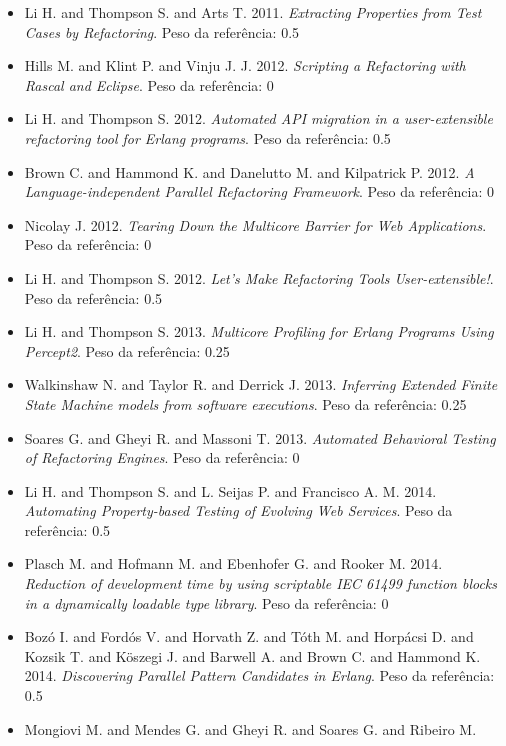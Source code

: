 \begin{itemize}
\item Li H. and Thompson S. and Arts T.
      2011.
      {\it Extracting Properties from Test Cases by Refactoring}.
      Peso da referência: 0.5
\item Hills M. and Klint P. and Vinju J. J.
      2012.
      {\it Scripting a Refactoring with Rascal and Eclipse}.
      Peso da referência: 0
\item Li H. and Thompson S.
      2012.
      {\it Automated API migration in a user-extensible refactoring tool for Erlang programs}.
      Peso da referência: 0.5
\item Brown C. and Hammond K. and Danelutto M. and Kilpatrick P.
      2012.
      {\it A Language-independent Parallel Refactoring Framework}.
      Peso da referência: 0
\item Nicolay J.
      2012.
      {\it Tearing Down the Multicore Barrier for Web Applications}.
      Peso da referência: 0
\item Li H. and Thompson S.
      2012.
      {\it Let's Make Refactoring Tools User-extensible!}.
      Peso da referência: 0.5
\item Li H. and Thompson S.
      2013.
      {\it Multicore Profiling for Erlang Programs Using Percept2}.
      Peso da referência: 0.25
\item Walkinshaw N. and Taylor R. and Derrick J.
      2013.
      {\it Inferring Extended Finite State Machine models from software executions}.
      Peso da referência: 0.25
\item Soares G. and Gheyi R. and Massoni T.
      2013.
      {\it Automated Behavioral Testing of Refactoring Engines}.
      Peso da referência: 0
\item Li H. and Thompson S. and L. Seijas P. and Francisco A. M.
      2014.
      {\it Automating Property-based Testing of Evolving Web Services}.
      Peso da referência: 0.5
\item Plasch M. and Hofmann M. and Ebenhofer G. and Rooker M.
      2014.
      {\it Reduction of development time by using scriptable IEC 61499 function blocks in a dynamically loadable type library}.
      Peso da referência: 0
\item Boz\'{o} I. and Ford\'{o}s V. and Horvath Z. and T\'{o}th M. and Horp\'{a}csi D. and Kozsik T. and K\"{o}szegi J. and Barwell A. and Brown C. and Hammond K.
      2014.
      {\it Discovering Parallel Pattern Candidates in Erlang}.
      Peso da referência: 0.5
\item Mongiovi M. and Mendes G. and Gheyi R. and Soares G. and Ribeiro M.

\end{itemize}
